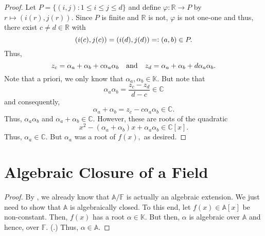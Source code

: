 \begin{proof}
    Let $P = \{(i, j) : 1 \le i \le j \le d\}$ and define $\varphi : \mathbb{R} \to P$ by $r \mapsto (i(r), j(r)).$ Since $P$ is finite and $\mathbb{R}$ is not, $\varphi$ is not one-one and thus, there exist $c \neq d \in \mathbb{R}$ with
    \begin{equation*} 
        (i(c), j(c)) = (i(d), j(d)) =\vcentcolon (a, b) \in P.
    \end{equation*}
    Thus,
    \begin{equation*} 
        z_c = \alpha_a + \alpha_b + c\alpha_a\alpha_b \quad\text{and}\quad z_d = \alpha_a + \alpha_b + d\alpha_a\alpha_b.
    \end{equation*}
    Note that a priori, we only know that $\alpha_a, \alpha_b \in \mathbb{K}.$ But note that
    \begin{equation*} 
        \alpha_a\alpha_b = \frac{z_c - z_d}{d - c} \in \mathbb{C}
    \end{equation*}
    and consequently,
    \begin{equation*} 
        \alpha_a + \alpha_b = z_c - c\alpha_a\alpha_b \in \mathbb{C}.
    \end{equation*}
    Thus, $\alpha_a\alpha_b$ and $\alpha_a + \alpha_b \in \mathbb{C}.$ However, these are roots of the quadratic
    \begin{equation*} 
        x^2 - (\alpha_a + \alpha_b)x + \alpha_a\alpha_b \in \mathbb{C}[x].
    \end{equation*}
    Thus, $\alpha_a \in \mathbb{C}.$ But $\alpha_a$ was a root of $f(x),$ as desired.
\end{proof}

\section{Algebraic Closure of a Field}
\alglcosureinalgclosedisclosed*\label{prop:alglcosureinalgclosedisclosed2}
\begin{flushright}\hyperref[prop:alglcosureinalgclosedisclosed]{\upsym}\end{flushright}
\begin{proof}
    By , we already know that $\mathbb{A}/\mathbb{F}$ is actually an algebraic extension. We just need to show that $\mathbb{A}$ is algebraically closed. To this end, let $f(x) \in \mathbb{A}[x]$ be non-constant. Then, $f(x)$ has a root $\alpha \in \mathbb{K}.$ But then, $\alpha$ is algebraic over $\mathbb{A}$ and hence, over $\mathbb{F}.$ (.) Thus, $\alpha \in \mathbb{A}.$
\end{proof}

